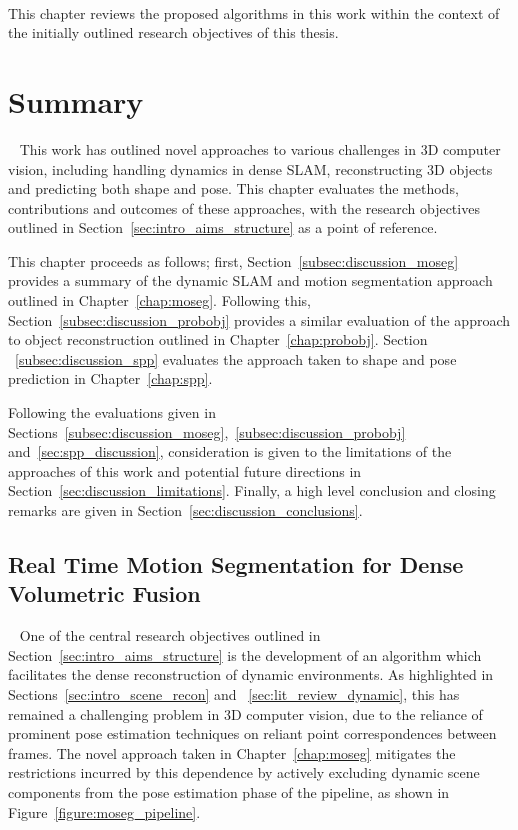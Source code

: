 ~\label{chap:discussion}
\begin{chapterabstract}
This chapter reviews the proposed algorithms in this work within the context 
of the initially outlined research objectives of this thesis.
\end{chapterabstract}

\section{Summary}
~\label{sec:discussion_summary}
This work has outlined novel approaches to various challenges in 3D computer vision, 
including handling dynamics in dense SLAM, reconstructing 3D objects and predicting both 
shape and pose. This chapter evaluates the methods, contributions and outcomes of these 
approaches, with the research objectives outlined in Section~\ref{sec:intro_aims_structure} 
as a point of reference.

This chapter proceeds as follows; first, Section~\ref{subsec:discussion_moseg} provides a 
summary of the dynamic SLAM and motion segmentation approach outlined in Chapter~\ref{chap:moseg}.
Following this, Section~\ref{subsec:discussion_probobj} provides a similar evaluation of the 
approach to object reconstruction outlined in Chapter~\ref{chap:probobj}. Section
~\ref{subsec:discussion_spp} evaluates the approach taken to shape and pose prediction in 
Chapter~\ref{chap:spp}.

Following the evaluations given in Sections~\ref{subsec:discussion_moseg},~\ref{subsec:discussion_probobj} 
and~\ref{sec:spp_discussion}, consideration is given to the limitations of the approaches of this work and 
potential future directions in Section~\ref{sec:discussion_limitations}. Finally, a high level conclusion and 
closing remarks are given in Section~\ref{sec:discussion_conclusions}.

\subsection{Real Time Motion Segmentation for Dense Volumetric Fusion}
~\label{subsec:discussion_moseg}
One of the central research objectives outlined in Section~\ref{sec:intro_aims_structure} 
is the development of an algorithm which facilitates the dense reconstruction of dynamic 
environments. As highlighted in Sections~\ref{sec:intro_scene_recon} and
~\ref{sec:lit_review_dynamic}, this has remained a challenging problem in 3D computer vision, 
due to the reliance of prominent pose estimation techniques on reliant point correspondences 
between frames. The novel approach taken in Chapter~\ref{chap:moseg} mitigates the restrictions 
incurred by this dependence by actively excluding dynamic scene components from the pose 
estimation phase of the pipeline, as shown in Figure~\ref{figure:moseg_pipeline}.

